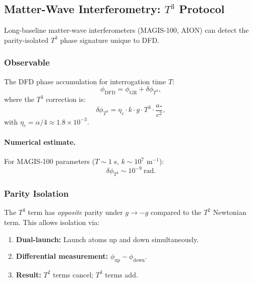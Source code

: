\subsection{Matter-Wave Interferometry: $T^3$ Protocol}\label{app:proto-mwi}

Long-baseline matter-wave interferometers (MAGIS-100, AION) can detect the 
parity-isolated $T^3$ phase signature unique to DFD.

\subsubsection{Observable}

The DFD phase accumulation for interrogation time $T$:
\begin{equation}
\phi_{\mathrm{DFD}} = \phi_{\mathrm{GR}} + \delta\phi_{T^3},
\end{equation}
where the $T^3$ correction is:
\begin{equation}
\delta\phi_{T^3} = \eta_c \cdot k \cdot g \cdot T^3 \cdot \frac{a_*}{c^2},
\end{equation}
with $\eta_c = \alpha/4 \approx 1.8 \times 10^{-3}$.

\paragraph{Numerical estimate.}
For MAGIS-100 parameters ($T \sim 1$ s, $k \sim 10^7$ m$^{-1}$):
\begin{equation}
\delta\phi_{T^3} \sim 10^{-9}~\text{rad}.
\end{equation}

\subsubsection{Parity Isolation}

The $T^3$ term has \emph{opposite} parity under $g \to -g$ compared to the 
$T^2$ Newtonian term. This allows isolation via:
\begin{enumerate}
\item \textbf{Dual-launch:} Launch atoms up and down simultaneously.
\item \textbf{Differential measurement:} $\phi_{\mathrm{up}} - \phi_{\mathrm{down}}$.
\item \textbf{Result:} $T^2$ terms cancel; $T^3$ terms add.
\end{enumerate}

